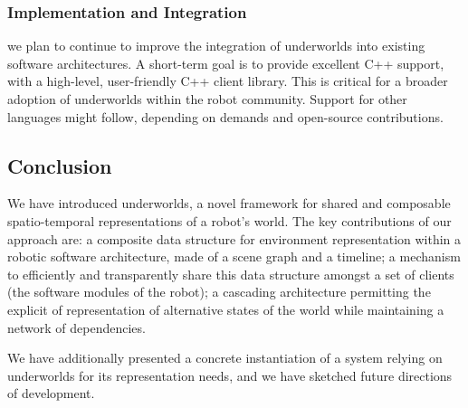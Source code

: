 \documentclass[letterpaper, 10pt, conference]{ieeeconf}
\newcommand{\uwds}{{\sc underworlds}\xspace}
\begin{document}
\subsubsection{Implementation and Integration} we plan to continue to
improve the integration of \uwds into existing software architectures. A
short-term goal is to provide excellent C++ support, with a high-level,
user-friendly C++ client library. This is critical for a broader adoption of \uwds
within the robot community. Support for other languages might follow, depending
on demands and open-source contributions.



\subsection{Conclusion}

We have introduced \uwds, a novel framework for shared and composable
spatio-temporal representations of a robot's world. The key contributions of our
approach are: a composite data structure for environment representation within a
robotic software architecture, made of a scene graph and a timeline; a mechanism
to efficiently and transparently share this data structure amongst a set of
clients (the software modules of the robot); a cascading architecture permitting
the explicit of representation of alternative states of the world while
maintaining a network of dependencies.

We have additionally presented a concrete instantiation of a system relying on \uwds
for its representation needs, and we have sketched future directions of
development.
\end{document}
